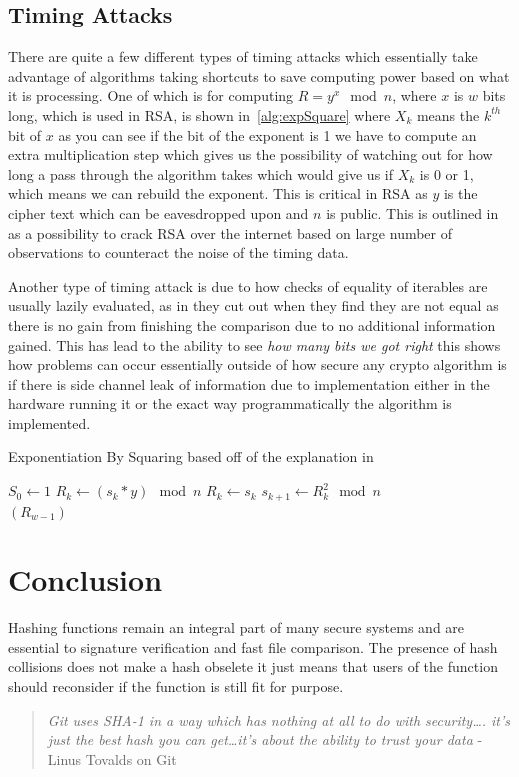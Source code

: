 \documentclass[a4paper,12pt]{article}
\begin{document}
\subsection{Timing Attacks}
There are quite a few different types of timing attacks which essentially take advantage of algorithms taking shortcuts to save computing power based on what it is processing. One of which is for computing $R = y^x \mod n$, where $x$ is $w$ bits long, which is used in RSA, is shown in~\ref{alg:expSquare} where $X_k$ means the $k^{th}$ bit of $x$ as you can see if the bit of the exponent is 1 we have to compute an extra multiplication step which gives us the possibility of watching out for how long a pass through the algorithm takes which would give us if $X_k$ is 0 or 1, which means we can rebuild the exponent. This is critical in RSA as $y$ is the cipher text which can be eavesdropped upon and $n$ is public. This is outlined in \cite{Crosby2009} as a possibility to crack RSA over the internet based on large number of observations to counteract the noise of the timing data.

Another type of timing attack is due to how checks of equality of iterables are usually lazily evaluated, as in they cut out when they find they are not equal as there is no gain from finishing the comparison due to no additional information gained. This has lead to the ability to see \emph{how many bits we got right} 
this shows how problems can occur essentially outside of how secure any crypto algorithm is if there is side channel leak of information due to implementation either in the hardware running it or the exact way programmatically the algorithm is implemented.


\begin{algorithm}
    \caption{Exponentiation By Squaring based off of the explanation in \cite{Systems}}
    \label{alg:expSquare}
\begin{algorithmic}
    \State $S_0 \gets 1$
        \State $R_k \gets (s_k * y) \mod n$
    \Else
        \State $R_k \gets s_k$
    \EndIf
    \State $s_{k+1} \gets R_k^2 \mod n$
    \EndFor\\
    \Return $(R_{w-1})$
\end{algorithmic}
\end{algorithm}

\newpage
\section{Conclusion}
Hashing functions remain an integral part of many secure systems and are essential to signature verification and fast file comparison. The presence of hash collisions does not make a hash obselete it just means that users of the function should reconsider if the function is still fit for purpose.
\begin{quotation}
    \emph{Git uses SHA-1 in a way which has nothing at all to do with security\dots. it's just the best hash you can get\dots it's about the ability to trust your data} - Linus Tovalds on Git
\end{quotation}
\end{document}
